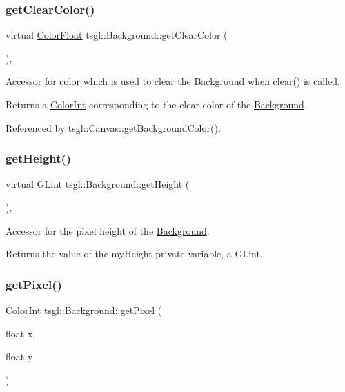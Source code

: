 \subsubsection{\texorpdfstring{get\+Clear\+Color()}{getClearColor()}}
{\footnotesize\ttfamily virtual \hyperlink{structtsgl_1_1_color_float}{Color\+Float} tsgl\+::\+Background\+::get\+Clear\+Color (\begin{DoxyParamCaption}{ }\end{DoxyParamCaption})\hspace{0.3cm}{\ttfamily [inline]}, {\ttfamily [virtual]}}



Accessor for color which is used to clear the \hyperlink{classtsgl_1_1_background}{Background} when clear() is called. 

Returns a \hyperlink{structtsgl_1_1_color_int}{Color\+Int} corresponding to the clear color of the \hyperlink{classtsgl_1_1_background}{Background}. 

Referenced by tsgl\+::\+Canvas\+::get\+Background\+Color().

\mbox{\label{classtsgl_1_1_background_aa6482a67b1feebc42989767823d87c07}} 
\subsubsection{\texorpdfstring{get\+Height()}{getHeight()}}
{\footnotesize\ttfamily virtual G\+Lint tsgl\+::\+Background\+::get\+Height (\begin{DoxyParamCaption}{ }\end{DoxyParamCaption})\hspace{0.3cm}{\ttfamily [inline]}, {\ttfamily [virtual]}}



Accessor for the pixel height of the \hyperlink{classtsgl_1_1_background}{Background}. 

Returns the value of the my\+Height private variable, a G\+Lint. \mbox{\label{classtsgl_1_1_background_a09d91731095fd0839eaf6e46c3d279b5}} 
\subsubsection{\texorpdfstring{get\+Pixel()}{getPixel()}}
{\footnotesize\ttfamily \hyperlink{structtsgl_1_1_color_int}{Color\+Int} tsgl\+::\+Background\+::get\+Pixel (\begin{DoxyParamCaption}\item[{float}]{x,  }\item[{float}]{y }\end{DoxyParamCaption})\hspace{0.3cm}{\ttfamily [virtual]}}



